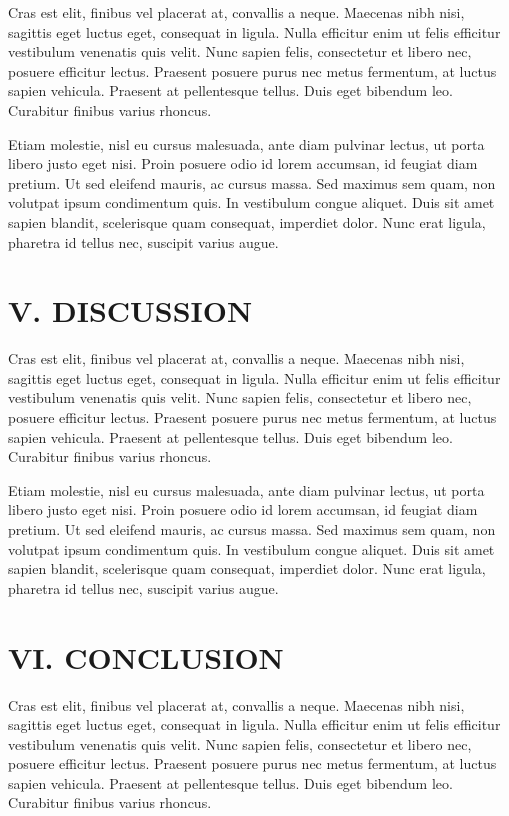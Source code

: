 \documentclass[a4paper,fleqn,spanish]{cas-dc}
\begin{document}
Cras est elit, finibus vel placerat at, convallis a neque. Maecenas nibh nisi,
sagittis eget luctus eget, consequat in ligula. Nulla efficitur enim ut felis
efficitur vestibulum venenatis quis velit. Nunc sapien felis, consectetur et
libero nec, posuere efficitur lectus. Praesent posuere purus nec metus
fermentum, at luctus sapien vehicula. Praesent at pellentesque tellus. Duis eget
bibendum leo. Curabitur finibus varius rhoncus.

Etiam molestie, nisl eu cursus malesuada, ante diam pulvinar lectus, ut porta
libero justo eget nisi. Proin posuere odio id lorem accumsan, id feugiat diam
pretium. Ut sed eleifend mauris, ac cursus massa. Sed maximus sem quam, non
volutpat ipsum condimentum quis. In vestibulum congue aliquet. Duis sit amet
sapien blandit, scelerisque quam consequat, imperdiet dolor. Nunc erat ligula,
pharetra id tellus nec, suscipit varius augue.


\section{V. DISCUSSION}\label{discusion}

Cras est elit, finibus vel placerat at, convallis a neque. Maecenas nibh nisi,
sagittis eget luctus eget, consequat in ligula. Nulla efficitur enim ut felis
efficitur vestibulum venenatis quis velit. Nunc sapien felis, consectetur et
libero nec, posuere efficitur lectus. Praesent posuere purus nec metus
fermentum, at luctus sapien vehicula. Praesent at pellentesque tellus. Duis eget
bibendum leo. Curabitur finibus varius rhoncus.

Etiam molestie, nisl eu cursus malesuada, ante diam pulvinar lectus, ut porta
libero justo eget nisi. Proin posuere odio id lorem accumsan, id feugiat diam
pretium. Ut sed eleifend mauris, ac cursus massa. Sed maximus sem quam, non
volutpat ipsum condimentum quis. In vestibulum congue aliquet. Duis sit amet
sapien blandit, scelerisque quam consequat, imperdiet dolor. Nunc erat ligula,
pharetra id tellus nec, suscipit varius augue.


\section{VI. CONCLUSION}\label{conclucion}

Cras est elit, finibus vel placerat at, convallis a neque. Maecenas nibh nisi,
sagittis eget luctus eget, consequat in ligula. Nulla efficitur enim ut felis
efficitur vestibulum venenatis quis velit. Nunc sapien felis, consectetur et
libero nec, posuere efficitur lectus. Praesent posuere purus nec metus
fermentum, at luctus sapien vehicula. Praesent at pellentesque tellus. Duis eget
bibendum leo. Curabitur finibus varius rhoncus.
\end{document}
